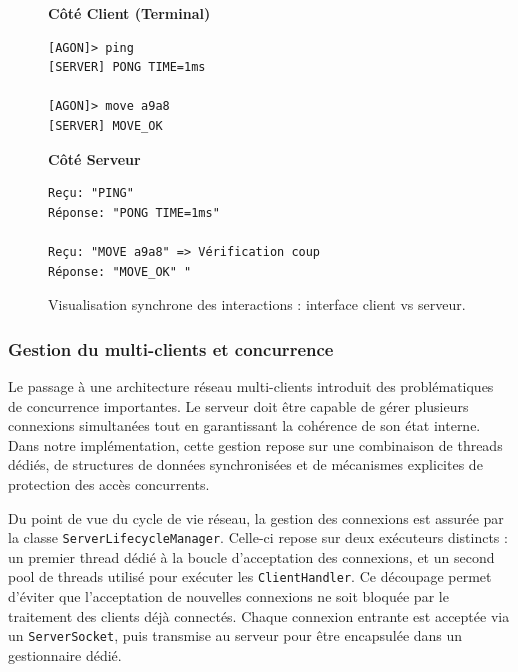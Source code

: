 \documentclass[a4paper]{article}
\begin{document}
\begin{figure}[htbp]
    \centering
    \begin{minipage}{0.48\textwidth}
        \centering
        \textbf{Côté Client (Terminal)}
        \begin{verbatim}
[AGON]> ping
[SERVER] PONG TIME=1ms

[AGON]> move a9a8
[SERVER] MOVE_OK
        \end{verbatim}
    \end{minipage}
    \hfill %
    \begin{minipage}
    {0.48\textwidth}
        \centering
        \textbf{Côté Serveur}
        \begin{verbatim}
Reçu: "PING"
Réponse: "PONG TIME=1ms"

Reçu: "MOVE a9a8" => Vérification coup
Réponse: "MOVE_OK" "
        \end{verbatim}
    \end{minipage}
    
    \caption{Visualisation synchrone des interactions : interface client vs serveur.}
    \label{fig:comparaison_client_serveur}
\end{figure}

\subsubsection{Gestion du multi-clients et concurrence}

Le passage à une architecture réseau multi-clients introduit des problématiques de concurrence importantes. Le serveur doit être capable de gérer plusieurs connexions simultanées tout en garantissant la cohérence de son état interne. Dans notre implémentation, cette gestion repose sur une combinaison de threads dédiés, de structures de données synchronisées et de mécanismes explicites de protection des accès concurrents.

Du point de vue du cycle de vie réseau, la gestion des connexions est assurée par la classe \texttt{ServerLifecycleManager}. Celle-ci repose sur deux exécuteurs distincts : un premier thread dédié à la boucle d’acceptation des connexions, et un second pool de threads utilisé pour exécuter les \texttt{ClientHandler}. Ce découpage permet d’éviter que l’acceptation de nouvelles connexions ne soit bloquée par le traitement des clients déjà connectés. Chaque connexion entrante est acceptée via un \texttt{ServerSocket}, puis transmise au serveur pour être encapsulée dans un gestionnaire dédié. 
\end{document}
